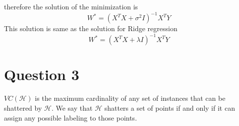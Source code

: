 \documentclass{article}
\begin{document}
therefore the solution of the minimization is 
\begin{equation*}
		W^* = (X^TX + \sigma^2I)^{-1}X^TY
\end{equation*}
This solution is same as the solution for Ridge regression
\begin{equation*}
	W^* = (X^TX  + \lambda I)^{-1}X^TY
\end{equation*}

\section*{Question 3}

$VC(\mathcal{H})$ is the maximum cardinality of any set of instances that can be shattered by $\mathcal{H}$. We say that $\mathcal{H}$ shatters a set of points if and only if it can assign any possible labeling to those points.
\end{document}
